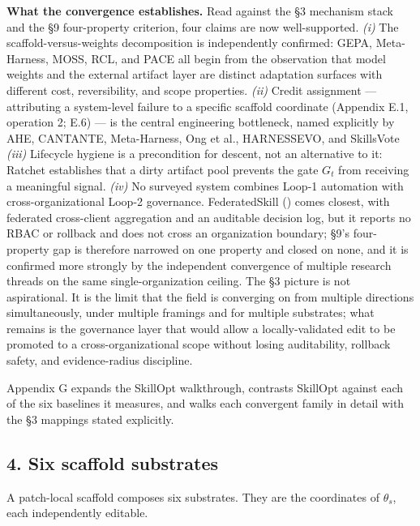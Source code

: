 \documentclass[
]{article}
\newcounter{none} %
\begin{document}
\textbf{What the convergence establishes.} Read against the §3 mechanism
stack and the §9 four-property criterion, four claims are now
well-supported. \emph{(i)} The scaffold-versus-weights decomposition is
independently confirmed: GEPA, Meta-Harness, MOSS, RCL, and PACE all
begin from the observation that model weights and the external artifact
layer are distinct adaptation surfaces with different cost,
reversibility, and scope properties. \emph{(ii)} Credit assignment ---
attributing a system-level failure to a specific scaffold coordinate
(Appendix E.1, operation 2; E.6) --- is the central engineering
bottleneck, named explicitly by AHE, CANTANTE, Meta-Harness, Ong et al.,
HARNESSEVO, and SkillsVote \emph{(iii)} Lifecycle hygiene is a
precondition for descent, not an alternative to it: Ratchet establishes
that a dirty artifact pool prevents the gate \(G_t\) from receiving a
meaningful signal. \emph{(iv)} No surveyed system combines Loop-1
automation with cross-organizational Loop-2 governance. FederatedSkill
() comes
closest, with federated cross-client aggregation and an auditable
decision log, but it reports no RBAC or rollback and does not cross an
organization boundary; §9's four-property gap is therefore narrowed on
one property and closed on none, and it is confirmed more strongly by
the independent convergence of multiple research threads on the same
single-organization ceiling. The §3 picture is not aspirational. It is
the limit that the field is converging on from multiple directions
simultaneously, under multiple framings and for multiple substrates;
what remains is the governance layer that would allow a
locally-validated edit to be promoted to a cross-organizational scope
without losing auditability, rollback safety, and evidence-radius
discipline.

Appendix G expands the SkillOpt walkthrough, contrasts SkillOpt against
each of the six baselines it measures, and walks each convergent family
in detail with the §3 mappings stated explicitly.

\subsection{4. Six scaffold substrates}\label{six-scaffold-substrates}

A patch-local scaffold composes six substrates. They are the coordinates
of \(\theta_s\), each independently editable.
\end{document}
